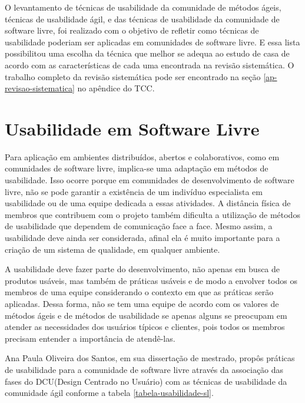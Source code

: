 %
O levantamento de técnicas de usabilidade da comunidade de métodos ágeis, técnicas
de usabilidade ágil, e das técnicas de usabilidade da comunidade de software livre, foi
realizado com o objetivo de refletir como técnicas de usabilidade poderiam ser aplicadas
em comunidades de software livre. E essa lista possibilitou uma escolha da técnica que melhor se adequa ao estudo de casa de acordo com as características de cada uma encontrada na revisão sistemática. O trabalho completo da revisão sistemática pode ser encontrado na seção \ref{ap-revisao-sistematica} no apêndice do TCC.

\section{Usabilidade em Software Livre}
\label{usabilidade-sl}
%
Para aplicação em ambientes distribuídos, abertos e colaborativos, como em comunidades de software livre, implica-se uma adaptação em métodos de usabilidade. Isso ocorre porque em comunidades de desenvolvimento de software livre, não se pode garantir a existência de um indivíduo especialista em usabilidade ou de uma equipe dedicada a essas atividades. A distância física de membros que contribuem com o projeto também dificulta a utilização de métodos de usabilidade que dependem de comunicação face a face. Mesmo assim, a usabilidade deve ainda ser considerada, afinal ela é muito importante para a criação de um sistema de qualidade, em qualquer ambiente.

%
A usabilidade deve fazer parte do desenvolvimento, não apenas em busca de produtos usáveis, mas também de práticas usáveis e de modo a envolver todos os membros de uma equipe considerando o contexto em que as práticas serão aplicadas. Dessa forma, não se tem uma equipe de acordo com os valores de métodos ágeis e de métodos de usabilidade se apenas alguns se preocupam em atender as necessidades dos usuários típicos e clientes, pois todos os membros precisam entender a importância de atendê-las.
~\cite{santos2012}

%
Ana Paula Oliveira dos Santos, em sua dissertação de mestrado, propôs práticas de usabilidade para a comunidade de software livre através da associação das fases do DCU(Design Centrado no Usuário) com as técnicas de usabilidade da comunidade ágil conforme a tabela \ref{tabela-usabilidade-sl}.

